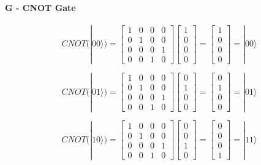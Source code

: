 \documentclass[12pt]{article}
\begin{document}
\paragraph*{G - CNOT Gate}

$$ CNOT(|00⟩) = \begin{bmatrix} 1 & 0 & 0 & 0 \\ 0 & 1 & 0 & 0 \\ 0 & 0 & 0 & 1 \\ 0 & 0 & 1 & 0 \end{bmatrix} \begin{bmatrix} 1 \\ 0 \\ 0 \\ 0 \end{bmatrix} = \begin{bmatrix} 1 \\ 0 \\ 0 \\ 0 \end{bmatrix} = |00⟩ $$

$$ CNOT(|01⟩) = \begin{bmatrix} 1 & 0 & 0 & 0 \\ 0 & 1 & 0 & 0 \\ 0 & 0 & 0 & 1 \\ 0 & 0 & 1 & 0 \end{bmatrix} \begin{bmatrix} 0 \\ 1 \\ 0 \\ 0 \end{bmatrix} = \begin{bmatrix} 0 \\ 1 \\ 0 \\ 0 \end{bmatrix} = |01⟩ $$

$$ CNOT(|10⟩) = \begin{bmatrix} 1 & 0 & 0 & 0 \\ 0 & 1 & 0 & 0 \\ 0 & 0 & 0 & 1 \\ 0 & 0 & 1 & 0 \end{bmatrix} \begin{bmatrix} 0 \\ 0 \\ 1 \\ 0 \end{bmatrix} = \begin{bmatrix} 0 \\ 0 \\ 0 \\ 1 \end{bmatrix} = |11⟩ $$
\end{document}
